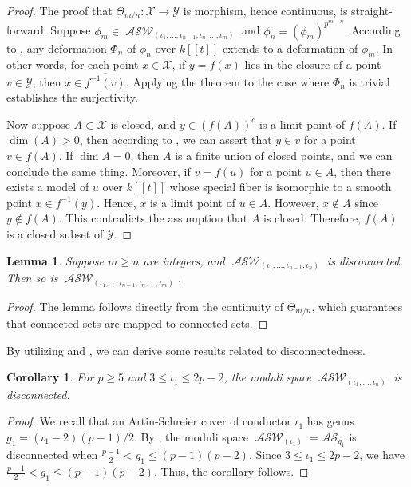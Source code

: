 \documentclass{compositio}
\newtheorem{lemma}[theorem]{Lemma}
\newtheorem{corollary}[theorem]{Corollary}
\theoremstyle{remark}
\theoremstyle{remark}
\DeclareMathOperator{\ASW}{\mathcal{ASW}}
\begin{document}
\begin{proof}
The proof that $\Theta_{m/n}: \mathscr{X} \xrightarrow{} \mathscr{Y}$ is morphism, hence continuous, is straight-forward. Suppose $\phi_m \in \ASW_{(\iota_1, \ldots, \iota_{n-1}, \iota_n, \ldots, \iota_m)}$ and $\phi_n=(\phi_m)^{p^{m-n}}$. According to \cite[Theorem 1.2]{2020arXiv201013614D}, any deformation $\Phi_n$ of $\phi_n$ over $k[[t]]$ extends to a deformation of $\phi_m$. In other words, for each point $x \in \mathscr{X}$, if $y=f(x)$ lies in the closure of a point $v \in \mathscr{Y}$, then $x \in \overline{f^{-1}(v)}$. Applying the theorem to the case where $\Phi_n$ is trivial establishes the surjectivity.

Now suppose $A\subset \mathscr{X}$ is closed, and $y \in
(f(A))^c$ is a limit point of $f(A)$. If $\dim (A)>0$, then according to \cite[Proposition 3.2]{DANG2020398}, we can assert that $y \in \overline{v}$ for a point $v \in f(A)$. If $\dim A=0$, then $A$ is a finite union of closed points, and we can conclude the same thing. Moreover, if $v=f(u)$ for a point $u \in A$, then there exists a model of $u$ over $k[[t]]$ whose special fiber is isomorphic to a smooth point $x \in f^{-1}(y)$. Hence, $x$ is a limit point of $u \in A$. However, $x \not\in A$ since $y \not\in f(A)$. This contradicts the assumption that $A$ is closed. Therefore, $f(A)$ is a closed subset of $\mathscr{Y}$.
\end{proof}


\begin{lemma}
Suppose $m \ge n$ are integers, and $\ASW_{(\iota_1, \ldots, \iota_{n-1}, \iota_n)}$ is disconnected. Then so is $\ASW_{(\iota_1, \ldots, \iota_{n-1}, \iota_n, \ldots, \iota_m)}$.
\end{lemma}

\begin{proof}
The lemma follows directly from the continuity of $\Theta_{m/n}$, which guarantees that connected sets are mapped to connected sets.
\end{proof}

By utilizing \cite{2020arXiv200203719D} and \cite{DANG2020398}, we can derive some results related to disconnectedness.


\begin{corollary}
    For $p \geq 5$ and $3 \leq \iota_1 \leq 2p-2$, the moduli space $\ASW_{(\iota_1, \ldots, \iota_n)}$ is disconnected.
\end{corollary}

\begin{proof}
We recall that an Artin-Schreier cover of conductor $\iota_1$ has genus $g_1 = (\iota_1-2)(p-1)/2$. By \cite[Theorem 1.3]{2020arXiv200203719D}, the moduli space $\ASW_{(\iota_1)} = \mathcal{AS}_{g_1}$ is disconnected when $\frac{p-1}{2} < g_1 \leq (p-1)(p-2)$. Since $3 \leq \iota_1 \leq 2p-2$, we have $\frac{p-1}{2} < g_1 \leq (p-1)(p-2)$. Thus, the corollary follows.
\end{proof}
\end{document}
